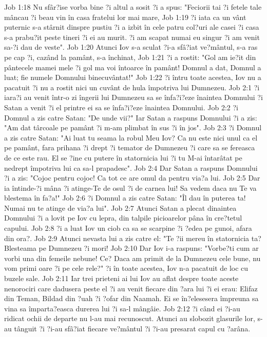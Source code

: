 Job 1:18  Nu sfâr?ise vorba bine ?i altul a sosit ?i a spus: "Feciorii tai ?i fetele tale mâncau ?i beau vin în casa fratelui lor mai mare,
Job 1:19  ?i iata ca un vânt puternic s-a stârnit dinspre pustiu ?i a izbit în cele patru col?uri ale casei ?i casa s-a prabu?it peste tineri ?i ei au murit. ?i am scapat numai eu singur ?i am venit sa-?i dau de veste".
Job 1:20  Atunci Iov s-a sculat ?i-a sfâ?iat ve?mântul, s-a ras pe cap ?i, cazând la pamânt, s-a închinat,
Job 1:21  ?i a rostit: "Gol am ie?it din pântecele mamei mele ?i gol ma voi întoarce în pamânt! Domnul a dat, Domnul a luat; fie numele Domnului binecuvântat!"
Job 1:22  ?i întru toate acestea, Iov nu a pacatuit ?i nu a rostit nici un cuvânt de hula împotriva lui Dumnezeu.
Job 2:1  ?i iara?i au venit într-o zi îngerii lui Dumnezeu sa se înfa?i?eze înaintea Domnului ?i Satan a venit ?i el printre ei sa se înfa?i?eze înaintea Domnului.
Job 2:2  ?i Domnul a zis catre Satan: "De unde vii?" Iar Satan a raspuns Domnului ?i a zis: "Am dat târcoale pe pamânt ?i m-am plimbat în sus ?i în jos".
Job 2:3  ?i Domnul a zis catre Satan: "Ai luat tu seama la robul Meu Iov? Ca nu este nici unul ca el pe pamânt, fara prihana ?i drept ?i temator de Dumnezeu ?i care sa se fereasca de ce este rau. El se ?ine cu putere în statornicia lui ?i tu M-ai întarâtat pe nedrept împotriva lui ca sa-l prapadesc".
Job 2:4  Dar Satan a raspuns Domnului ?i a zis: "Cojoc pentru cojoc! Ca tot ce are omul da pentru via?a lui.
Job 2:5  Dar ia întinde-?i mâna ?i atinge-Te de osul ?i de carnea lui! Sa vedem daca nu Te va blestema în fa?a!"
Job 2:6  ?i Domnul a zis catre Satan: "Îl dau în puterea ta! Numai nu te atinge de via?a lui".
Job 2:7  Atunci Satan a plecat dinaintea Domnului ?i a lovit pe Iov cu lepra, din talpile picioarelor pâna în cre?tetul capului.
Job 2:8  ?i a luat Iov un ciob ca sa se scarpine ?i ?edea pe gunoi, afara din ora?.
Job 2:9  Atunci nevasta lui a zis catre el: "Te ?ii mereu în statornicia ta? Blesteama pe Dumnezeu ?i mori!
Job 2:10  Dar Iov i-a raspuns: "Vorbe?ti cum ar vorbi una din femeile nebune! Ce? Daca am primit de la Dumnezeu cele bune, nu vom primi oare ?i pe cele rele?" ?i în toate acestea, Iov n-a pacatuit de loc cu buzele sale.
Job 2:11  Iar trei prieteni ai lui Iov au aflat despre toate aceste nenorociri care dadusera peste el ?i au venit fiecare din ?ara lui ?i ei erau: Elifaz din Teman, Bildad din ?uah ?i ?ofar din Naamah. Ei se în?elesesera împreuna sa vina sa împarta?easca durerea lui ?i sa-l mângâie.
Job 2:12  ?i când ei ?i-au ridicat ochii de departe nu l-au mai recunoscut. Atunci au slobozit glasurile lor, s-au tânguit ?i ?i-au sfâ?iat fiecare ve?mântul ?i ?i-au presarat capul cu ?arâna.

